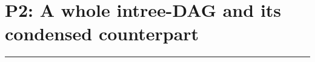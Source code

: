 \documentclass{report}
\begin{document}
  
\newcommand{\leveltop}{0}
\newcommand{\leveltopI}{0}
\newcommand{\leveltopII}{0}
\newcommand{\leveltopIII}{0}
\newcommand{\leveltopIIII}{0}
\newcommand{\leveltopIIIII}{0}
\newcommand{\leveltopIIIIII}{0}
\newcommand{\leveltopIIIIIII}{0}
\newcommand{\leveltopIIIIIIII}{0}
\newcommand{\leveltopIIIIIIIII}{0}
\newcommand{\leveltopIIIIIIIIII}{0}
\newcommand{\leveltopIIIIIIIIIII}{0}
\newcommand{\leveltopIIIIIIIIIIII}{0}
\newcommand{\leveltopIIIIIIIIIIIII}{0}
\newcommand{\leveltopIIIIIIIIIIIIII}{0}
\newcommand{\leveltopIIIIIIIIIIIIIII}{0}
\newcommand{\leveltopIIIIIIIIIIIIIIII}{0}
\newcommand{\leveltopIIIIIIIIIIIIIIIII}{0}
\newcommand{\leveltopIIIIIIIIIIIIIIIIII}{0}
\newcommand{\leveltopIIIIIIIIIIIIIIIIIII}{0}
\newcommand{\leveltopIIIIIIIIIIIIIIIIIIII}{0}
\newcommand{\leveltopIIIIIIIIIIIIIIIIIIIII}{0}
\newcommand{\leveltopIIIIIIIIIIIIIIIIIIIIII}{0}
\newcommand{\leveltopIIIIIIIIIIIIIIIIIIIIIII}{0}
\newcommand{\leveltopIIIIIIIIIIIIIIIIIIIIIIII}{0}
\newcommand{\leveltopIIIIIIIIIIIIIIIIIIIIIIIII}{0}
\newcommand{\leveltopIIIIIIIIIIIIIIIIIIIIIIIIII}{0}
\newcommand{\leveltopIIIIIIIIIIIIIIIIIIIIIIIIIII}{0}
\newcommand{\leveltopIIIIIIIIIIIIIIIIIIIIIIIIIIII}{0}
\newcommand{\leveltopIIIIIIIIIIIIIIIIIIIIIIIIIIIII}{0}

\section{P2: A whole intree-DAG and its condensed counterpart}



\hrule
\end{document}
